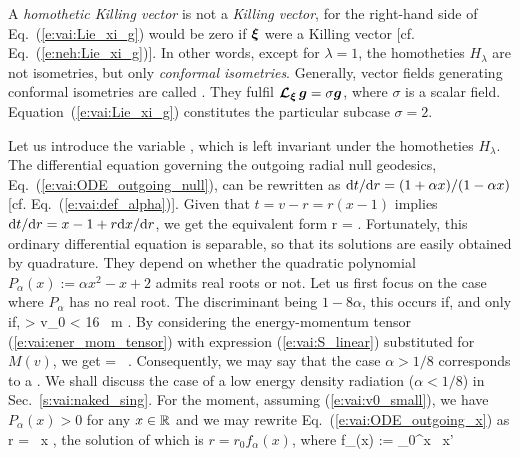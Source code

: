 \begin{remark}
A \emph{homothetic Killing vector} is not a \emph{Killing vector},
for the right-hand side of Eq.~(\ref{e:vai:Lie_xi_g}) would be zero if
$\bm{\xi}$ were a Killing vector [cf. Eq.~(\ref{e:neh:Lie_xi_g})].
In other words, except for $\lambda=1$, the homotheties $H_\lambda$ are not isometries,
but only \emph{conformal isometries}.
Generally, vector fields generating conformal isometries are
called .
They fulfil $\bm{\mathcal{L}}_{\bm{\xi}}\, \bm{g} = \sigma \bm{g}$, where $\sigma$ is a scalar field.
Equation~(\ref{e:vai:Lie_xi_g}) constitutes the particular subcase $\sigma = 2$.
\end{remark}

Let us introduce the variable
\be \label{e:vai:def_x_v_r}
    ,
\ee
which is left invariant under the homotheties $H_\lambda$.
The differential equation governing the outgoing radial null
geodesics, Eq.~(\ref{e:vai:ODE_outgoing_null}),
can be rewritten as $\mathrm{d} t / \mathrm{d} r = (1 + \alpha x)/(1 - \alpha x)$ [cf. Eq.~(\ref{e:vai:def_alpha})].
Given that $t = v - r = r(x - 1)$ implies $\mathrm{d} t / \mathrm{d} r = x - 1 + r \mathrm{d} x/\mathrm{d} r$,
we get the equivalent form
\be \label{e:vai:ODE_outgoing_x}
    r  =  .
\ee
Fortunately, this ordinary differential equation is separable, so that its
solutions are easily obtained by quadrature. They depend on whether the
quadratic polynomial $P_\alpha(x) := \alpha x^2 - x + 2$ admits real roots
or not.
Let us first focus on the case where $P_\alpha$ has no real root.
The discriminant being $1 - 8\alpha$, this occurs if, and only if,
\be \label{e:vai:v0_small}
    \alpha >  \iff v_0 < 16 \, m .
\ee
By considering the energy-momentum tensor (\ref{e:vai:ener_mom_tensor}) with
expression (\ref{e:vai:S_linear}) substituted for $M(v)$, we get
\be \label{e:vai:T_alpha}
 = \,  \otimes {} .
\ee
Consequently, we may say that the case $\alpha > 1/8$
corresponds to
a .
We shall discuss the case of a low energy density radiation
($\alpha < 1/8$)
in Sec.~\ref{s:vai:naked_sing}.
For the moment, assuming (\ref{e:vai:v0_small}),
we have $P_\alpha(x) > 0$ for any $x\in\mathbb{R}$ and we may rewrite Eq.~(\ref{e:vai:ODE_outgoing_x})
as
\be \label{e:vai:ODE_outgoing_x_sep}
    \D \ln r = \, \D x ,
\ee
the solution of which is $r = r_0 f_\alpha(x)$, where
\be \label{e:vai:lnf_alpha}
    \ln f_\alpha(x) := \int_0^x \, \D x'
